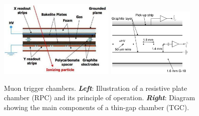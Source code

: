 
\begin{figure}[!htb]
    \begin{center}
        \includegraphics[width=0.5\textwidth]{figures/chapter2/muon_spec/rpc_chamber}
        \includegraphics[width=0.38\textwidth]{figures/chapter2/muon_spec/tgc_chamber}
        \caption{
            Muon trigger chambers.
            \textbf{\textit{Left}}: Illustration of a resistive plate chamber (RPC) and its principle of operation.
            \textbf{\textit{Right}}: Diagram showing the main components of a thin-gap chamber (TGC).
        }
        \label{fig:muon_trigger_chamber}
    \end{center}
\end{figure}
